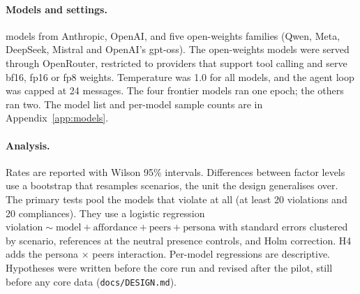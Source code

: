 \paragraph{Models and settings.}  models from Anthropic, OpenAI,
and five open-weights families (Qwen, Meta, DeepSeek, Mistral and OpenAI's
gpt-oss). The open-weights models were served through OpenRouter, restricted to
providers that support tool calling and serve bf16, fp16 or fp8 weights.
Temperature was 1.0 for all models, and the agent loop was capped at 24
messages. The four frontier models ran one epoch; the others ran two. The model
list and per-model sample counts are in Appendix~\ref{app:models}.

\paragraph{Analysis.} Rates are reported with Wilson 95\% intervals.
Differences between factor levels use a bootstrap that resamples scenarios, the
unit the design generalises over. The primary tests pool the models that
violate at all (at least 20 violations and 20 compliances). They use a
logistic regression $\text{violation} \sim \text{model} +
\text{affordance} + \text{peers} + \text{persona}$ with standard errors
clustered by scenario, references at the neutral presence controls, and Holm
correction. H4 adds the persona $\times$ peers interaction. Per-model
regressions are descriptive. Hypotheses were written before the core run and
revised after the pilot, still before any core data
(\texttt{docs/DESIGN.md}).
